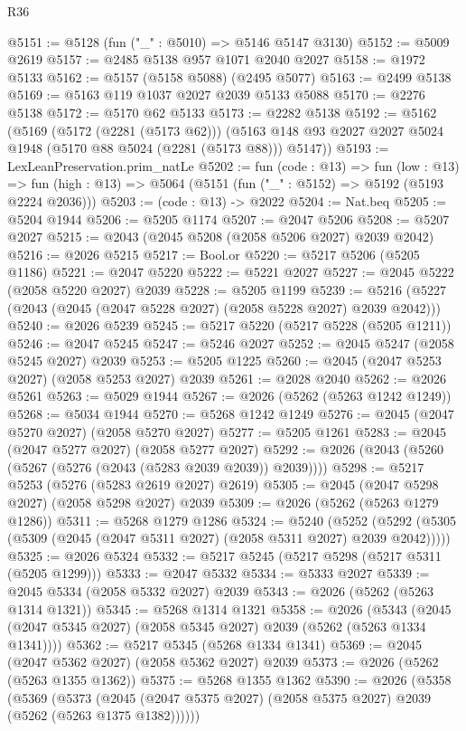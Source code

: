 \begin{lexlean}{R36}
\begin{coremodule}
@5151 := @5128 (fun ("_" : @5010) => @5146 @5147 @3130)
@5152 := @5009 @2619
@5157 := @2485 @5138 @957 @1071 @2040 @2027
@5158 := @1972 @5133
@5162 := @5157 (@5158 @5088) (@2495 @5077)
@5163 := @2499 @5138
@5169 := @5163 @119 @1037 @2027 @2039 @5133 @5088
@5170 := @2276 @5138
@5172 := @5170 @62 @5133
@5173 := @2282 @5138
@5192 := @5162
    (@5169
      (@5172 (@2281 (@5173 @62)))
      (@5163 @148 @93 @2027 @2027 @5024 @1948 (@5170 @88 @5024 (@2281 (@5173 @88))) @5147))
@5193 := LexLeanPreservation.prim_natLe
@5202 := fun (code : @13) =>
  fun (low : @13) =>
  fun (high : @13) => @5064 (@5151 (fun ("_" : @5152) => @5192 (@5193 @2224 @2036)))
@5203 := (code : @13) -> @2022
@5204 := Nat.beq
@5205 := @5204 @1944
@5206 := @5205 @1174
@5207 := @2047 @5206
@5208 := @5207 @2027
@5215 := @2043 (@2045 @5208 (@2058 @5206 @2027) @2039 @2042)
@5216 := @2026 @5215
@5217 := Bool.or
@5220 := @5217 @5206 (@5205 @1186)
@5221 := @2047 @5220
@5222 := @5221 @2027
@5227 := @2045 @5222 (@2058 @5220 @2027) @2039
@5228 := @5205 @1199
@5239 := @5216 (@5227 (@2043 (@2045 (@2047 @5228 @2027) (@2058 @5228 @2027) @2039 @2042)))
@5240 := @2026 @5239
@5245 := @5217 @5220 (@5217 @5228 (@5205 @1211))
@5246 := @2047 @5245
@5247 := @5246 @2027
@5252 := @2045 @5247 (@2058 @5245 @2027) @2039
@5253 := @5205 @1225
@5260 := @2045 (@2047 @5253 @2027) (@2058 @5253 @2027) @2039
@5261 := @2028 @2040
@5262 := @2026 @5261
@5263 := @5029 @1944
@5267 := @2026 (@5262 (@5263 @1242 @1249))
@5268 := @5034 @1944
@5270 := @5268 @1242 @1249
@5276 := @2045 (@2047 @5270 @2027) (@2058 @5270 @2027)
@5277 := @5205 @1261
@5283 := @2045 (@2047 @5277 @2027) (@2058 @5277 @2027)
@5292 := @2026 (@2043 (@5260 (@5267 (@5276 (@2043 (@5283 @2039 @2039)) @2039))))
@5298 := @5217 @5253 (@5276 (@5283 @2619 @2027) @2619)
@5305 := @2045 (@2047 @5298 @2027) (@2058 @5298 @2027) @2039
@5309 := @2026 (@5262 (@5263 @1279 @1286))
@5311 := @5268 @1279 @1286
@5324 := @5240
    (@5252 (@5292 (@5305 (@5309 (@2045 (@2047 @5311 @2027) (@2058 @5311 @2027) @2039 @2042)))))
@5325 := @2026 @5324
@5332 := @5217 @5245 (@5217 @5298 (@5217 @5311 (@5205 @1299)))
@5333 := @2047 @5332
@5334 := @5333 @2027
@5339 := @2045 @5334 (@2058 @5332 @2027) @2039
@5343 := @2026 (@5262 (@5263 @1314 @1321))
@5345 := @5268 @1314 @1321
@5358 := @2026
    (@5343 (@2045 (@2047 @5345 @2027) (@2058 @5345 @2027) @2039 (@5262 (@5263 @1334 @1341))))
@5362 := @5217 @5345 (@5268 @1334 @1341)
@5369 := @2045 (@2047 @5362 @2027) (@2058 @5362 @2027) @2039
@5373 := @2026 (@5262 (@5263 @1355 @1362))
@5375 := @5268 @1355 @1362
@5390 := @2026
    (@5358
      (@5369
        (@5373 (@2045 (@2047 @5375 @2027) (@2058 @5375 @2027) @2039 (@5262 (@5263 @1375 @1382))))))

\end{coremodule}
\end{lexlean}

